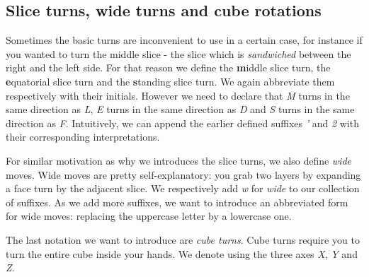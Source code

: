\documentclass{scrreprt}
\begin{document}
\subsection{Slice turns, wide turns and cube rotations}
Sometimes the basic turns are inconvenient to use in a certain case, for instance if you wanted to turn the middle slice - the slice which is \emph{sandwiched} between the right and the left side. For that reason we define the \textbf{m}iddle slice turn, the \textbf{e}quatorial slice turn and the \textbf{s}tanding slice turn. We again abbreviate them respectively with their initials. However we need to declare that \emph{M} turns in the same direction as \emph{L}, \emph{E} turns in the same direction as \emph{D} and \emph{S} turns in the same direction as \emph{F}. Intuitively, we can append the earlier defined suffixes \emph{'} and \emph{2} with their corresponding interpretations.\par
For similar motivation as why we introduces the slice turns, we also define \emph{wide} moves. Wide moves are pretty self-explanatory: you grab two layers by expanding a face turn by the adjacent slice. We respectively add \emph{w} for \emph{wide} to our collection of suffixes. As we add more suffixes, we want to introduce an abbreviated form for wide moves: replacing the uppercase letter by a lowercase one.\par
The last notation we want to introduce are \emph{cube turns}. Cube turns require you to turn the entire cube inside your hands. We denote 	using the three axes \emph{X}, \emph{Y} and \emph{Z}.
\end{document}
